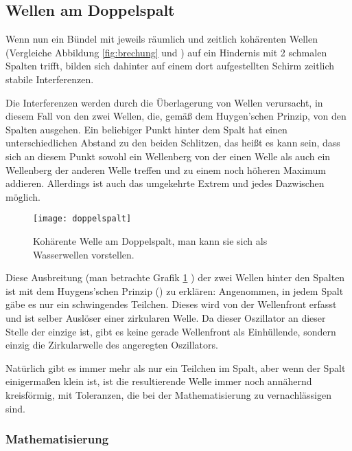 \subsection{Wellen am Doppelspalt} \label{subsec:doppelspalt}

Wenn nun ein Bündel mit jeweils räumlich und zeitlich kohärenten Wellen (Vergleiche Abbildung \ref{fig:brechung} und ) auf ein Hindernis mit 2 schmalen Spalten trifft, bilden sich dahinter auf einem dort aufgestellten Schirm zeitlich stabile Interferenzen.

Die Interferenzen werden durch die Überlagerung von Wellen verursacht, in diesem Fall von den zwei Wellen, die, gemäß dem Huygen'schen Prinzip, von den Spalten ausgehen. Ein beliebiger Punkt hinter dem Spalt hat einen unterschiedlichen Abstand zu den beiden Schlitzen, das heißt es kann sein, dass sich an diesem Punkt sowohl ein Wellenberg von der einen Welle als auch ein Wellenberg der anderen Welle treffen und zu einem noch höheren Maximum addieren. Allerdings ist auch das umgekehrte Extrem und jedes Dazwischen möglich.

\begin{figure}[!h]
	\center
	\texttt{[image: doppelspalt]}
	\caption{Kohärente Welle am Doppelspalt, man kann sie sich als Wasserwellen vorstellen.}
	\label{fig:doppelspaltwasser}
\end{figure}

Diese Ausbreitung (man betrachte Grafik \ref{fig:doppelspaltwasser} ) der zwei Wellen hinter den Spalten ist mit dem Huygens'schen Prinzip () zu erklären: Angenommen, in jedem Spalt gäbe es nur ein schwingendes Teilchen. Dieses wird von der Wellenfront erfasst und ist selber Auslöser einer zirkularen Welle. Da dieser Oszillator an dieser Stelle der einzige ist, gibt es keine gerade Wellenfront als Einhüllende, sondern einzig die Zirkularwelle des angeregten Oszillators.

Natürlich gibt es immer mehr als nur ein Teilchen im Spalt, aber wenn der Spalt einigermaßen klein ist, ist die resultierende Welle immer noch annähernd kreisförmig, mit Toleranzen, die bei der Mathematisierung zu vernachlässigen sind.


\subsubsection{Mathematisierung}

